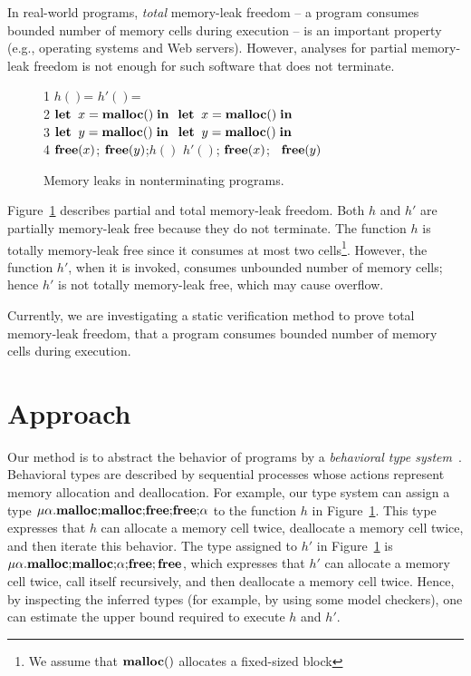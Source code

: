 \documentclass{sigplanconf}
\begin{document}
In real-world programs, \emph{total} memory-leak freedom -- a program
consumes bounded number of memory cells during execution -- is an
important property (e.g., operating systems and Web servers). However,
analyses for partial memory-leak freedom is not enough for such
software that does not terminate.

\begin{exmp}\label{ex:ex1}
\begin{figure}[h]
1  \;\;$h()$= \dtb \dtb  \dtb      \dtb          \dtb $h'()$= \\
2  \dtb $\mathbf{let}\; \; x = \mathbf{malloc()}  \; \mathbf{in}\;$ \dtb \;\;\;\;$\mathbf{let}\; \; x = \mathbf{malloc()}  \; \mathbf{in}\;$\\
3  \dtb $\mathbf{let}\; \; y = \mathbf{malloc()}  \; \mathbf{in}\;$ \dtb \;\;\;\; $\mathbf{let}\; \; y = \mathbf{malloc()}  \; \mathbf{in}\;$\\
4  \dtb $\mathbf{free}(x)$; $\mathbf{free}(y) $;\;$h()$ \dtb \;\;\;\;\;\;$h'()$; $\mathbf{free}(x)$; \ $\mathbf{free}(y)$
\caption{Memory leaks in nonterminating programs.}
\label{ex:np}
\end{figure}
Figure~\ref{ex:np} describes partial and total memory-leak freedom.
Both \(h\) and \(h'\) are partially memory-leak free because they do
not terminate. The function \(h\) is totally memory-leak free since it
consumes at most two cells\footnote{We assume that \(\mathbf{malloc()}\)
  allocates a fixed-sized block}.  However, the function \(h'\), when
it is invoked, consumes unbounded number of memory cells; hence \(h'\)
is not totally memory-leak free, which may cause overflow.
\end{exmp}

Currently, we are investigating a static verification method to prove
total memory-leak freedom, that a program consumes bounded number of
memory cells during execution.

\section{Approach}
Our method is to abstract the behavior of programs by a
\emph{behavioral type
  system}~\cite{DBLP:journals/lmcs/KobayashiSW06,DBLP:journals/tcs/IgarashiK04,DBLP:conf/esop/HondaVK98}.
Behavioral types are described by sequential processes whose actions
represent memory allocation and deallocation. For example, our type
system can assign a type
\(\mu\alpha.\mathbf{malloc};\!\mathbf{malloc};\!\mathbf{free};\!\mathbf{free};\!\alpha\) to
the function \(h\) in Figure~\ref{ex:np}.  This type expresses that
\(h\) can allocate a memory cell twice, deallocate a memory cell
twice, and then iterate this behavior.  The type assigned to \(h'\) in
Figure~\ref{ex:np} is
\(\mu\alpha.\mathbf{malloc};\!\mathbf{malloc};\!\alpha;\!\mathbf{free};\mathbf{free}\), which
expresses that \(h'\) can allocate a memory cell twice, call itself
recursively, and then deallocate a memory cell twice.  Hence, by
inspecting the inferred types (for example, by using some model
checkers), one can estimate the upper bound required to execute \(h\)
and \(h'\).
\end{document}
